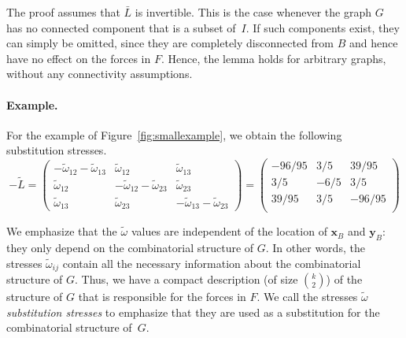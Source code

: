 \documentclass{article}
\theoremstyle{plain} \newtheorem{thm}{Theorem}[section]
\newcommand{\ot}{\tilde{\omega}}
\begin{document}
The proof assumes that $\bar L$ is invertible. This is the case
whenever the graph $G$ has no connected component that is a subset
of~$I$. If such components exist, they can simply be omitted, since
they are completely disconnected from $B$ and hence have no effect on
the forces in $F$. Hence, the lemma holds for arbitrary graphs, without any connectivity assumptions.

\paragraph{Example.}
For the example of Figure~\ref{fig:smallexample},
we obtain the following substitution stresses.
$$-\tilde{L}=
\begin{pmatrix}
  -\ot_{12}-\ot_{13}  &\ot_{12}&\ot_{13}\\
  \ot_{12}&-\ot_{12} -\ot_{23}&\ot_{23}\\
  \ot_{13}&\ot_{23} &-\ot_{13}-\ot_{23}
\end{pmatrix}
=
\begin{pmatrix}
  -96/95 & 3/5 & 39/95\\
  3/5 & -6/5 & 3/5\\
  39/95 & 3/5 & -96/95\\
\end{pmatrix}
$$







We emphasize that the $\ot$ values are independent
of the location of $\mathbf{x}_B$ and $\mathbf{y}_B$: they only depend on the
combinatorial structure of $G$. In other words, the stresses
$\ot_{ij}$ contain all the necessary information about the
combinatorial structure of $G$. Thus, we have a compact
description (of size $\binom k2$) of the structure of $G$ that 
is responsible
for the forces in $F$. We call the stresses $\ot$ \textit{substitution
  stresses} 
to emphasize that they are used
as a substitution for the combinatorial structure of~$G$.
\end{document}
